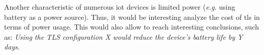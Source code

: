 Another characteristic of numerous \gls{iot} devices is limited power (\textit{e.g.} using battery as a power source). 
Thus, it would be interesting analyze the cost of \gls{tls} in terms of power usage. This would also allow to reach 
interesting conclusions, such as: \textit{Using the TLS configuration X would reduce the device's battery life by Y days}.